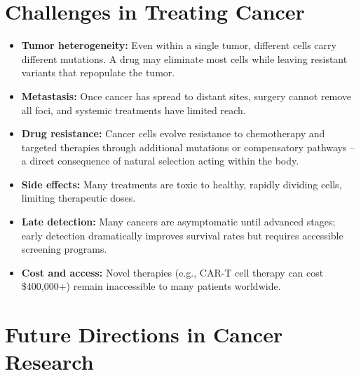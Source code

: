 \documentclass[11pt, letterpaper]{article}
\begin{document}
\section*{Challenges in Treating Cancer}

\begin{itemize}[noitemsep]
  \item \textbf{Tumor heterogeneity:} Even within a single tumor, different cells carry different mutations. A drug may eliminate most cells while leaving resistant variants that repopulate the tumor.
  \item \textbf{Metastasis:} Once cancer has spread to distant sites, surgery cannot remove all foci, and systemic treatments have limited reach.
  \item \textbf{Drug resistance:} Cancer cells evolve resistance to chemotherapy and targeted therapies through additional mutations or compensatory pathways -- a direct consequence of natural selection acting within the body.
  \item \textbf{Side effects:} Many treatments are toxic to healthy, rapidly dividing cells, limiting therapeutic doses.
  \item \textbf{Late detection:} Many cancers are asymptomatic until advanced stages; early detection dramatically improves survival rates but requires accessible screening programs.
  \item \textbf{Cost and access:} Novel therapies (e.g., CAR-T cell therapy can cost \$400,000+) remain inaccessible to many patients worldwide.
\end{itemize}

\section*{Future Directions in Cancer Research}
\end{document}
